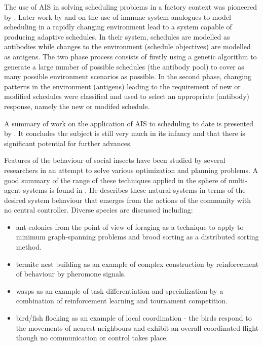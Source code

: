 The use of AIS in solving scheduling problems in a factory context was pioneered by \citet{mori94immune}. Later work by \citet{hart98producing} and \citet{hart99immune} on the use of immune system analogues to model scheduling in a rapidly changing environment lead to a system capable of producing adaptive schedules. In their system, schedules are modelled as antibodies while changes to the environment (schedule objectives) are modelled as antigens. The two phase process consists of firstly using a genetic algorithm to generate a large number of possible schedules (the antibody pool) to cover as many possible environment scenarios as possible. In the second phase, changing patterns in the environment (antigens) leading to the requirement of new or modified schedules were classified and used to select an appropriate (antibody) response, namely the new or modifed schedule. 

A summary of work on the application of AIS to scheduling to date is presented by \citet{darmoul06scheduling}. It concludes the subject is still very much in its infancy and that there is significant potential for further advances.

Features of the behaviour of social insects have been studied by several researchers in an attempt to solve various optimization and planning problems. A good summary of the range of these techniques applied in the sphere of multi-agent systems is found in \citet{parunak97ant}. He describes these natural systems in terms of the desired system behaviour that emerges from the actions of the community with no central controller. Diverse species are discussed including: 

\begin{itemize}

\item ant colonies from the point of view of foraging as a technique to apply to minimum graph-spanning problems and brood sorting as a distributed sorting method.

\item termite nest building as an example of complex construction by reinforcement of behaviour by pheromone signals. 

\item wasps as an example of task differentiation and specialization by a combination of reinforcement learning and tournament competition.

\item bird/fish flocking as an example of local coordination - the birds respond to the movements of nearest neighbours and exhibit an overall coordinated flight though no communication or control takes place. 

\end{itemize}

